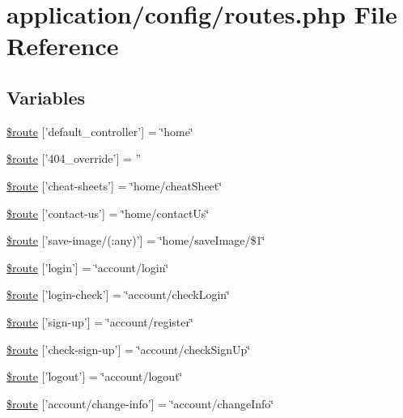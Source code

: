 \hypertarget{routes_8php}{\section{application/config/routes.php File Reference}
\label{routes_8php}
}
\subsection*{Variables}
\begin{DoxyCompactItemize}
\item 
\hyperlink{routes_8php_a6c2a82e4cec825eb1921141d08af834b}{\$route} \mbox{[}'default\-\_\-controller'\mbox{]} = \char`\"{}home\char`\"{}
\item 
\hyperlink{routes_8php_ad99ba8a90b758dbe982c621c9f27eedc}{\$route} \mbox{[}'404\-\_\-override'\mbox{]} = ''
\item 
\hyperlink{routes_8php_a68f9537f20c6adee48d71cd857b01410}{\$route} \mbox{[}'cheat-\/sheets'\mbox{]} = \char`\"{}home/cheat\-Sheet\char`\"{}
\item 
\hyperlink{routes_8php_a879b37eb8ab23f146ef5d9c1f99c4156}{\$route} \mbox{[}'contact-\/us'\mbox{]} = \char`\"{}home/contact\-Us\char`\"{}
\item 
\hyperlink{routes_8php_ada107d2f4f76b05d59584b97f4620e4e}{\$route} \mbox{[}'save-\/image/(\-:any)'\mbox{]} = \char`\"{}home/save\-Image/\$1\char`\"{}
\item 
\hyperlink{routes_8php_ae498edf30300ac629d57d6f792269b5e}{\$route} \mbox{[}'login'\mbox{]} = \char`\"{}account/login\char`\"{}
\item 
\hyperlink{routes_8php_a802ddf2665f072c35f9e48b2b5f7e9ce}{\$route} \mbox{[}'login-\/check'\mbox{]} = \char`\"{}account/check\-Login\char`\"{}
\item 
\hyperlink{routes_8php_a1a7cba54e5f132d593cd2e73f0b4aa21}{\$route} \mbox{[}'sign-\/up'\mbox{]} = \char`\"{}account/register\char`\"{}
\item 
\hyperlink{routes_8php_aed782d27d10fc156cc2bfd21da5f511b}{\$route} \mbox{[}'check-\/sign-\/up'\mbox{]} = \char`\"{}account/check\-Sign\-Up\char`\"{}
\item 
\hyperlink{routes_8php_a1d3e833786c5b494a7e64bd90543ff54}{\$route} \mbox{[}'logout'\mbox{]} = \char`\"{}account/logout\char`\"{}
\item 
\hyperlink{routes_8php_a456226c2c4c89e963ae1f7a39c05f664}{\$route} \mbox{[}'account/change-\/info'\mbox{]} = \char`\"{}account/change\-Info\char`\"{}

\end{DoxyCompactItemize}
